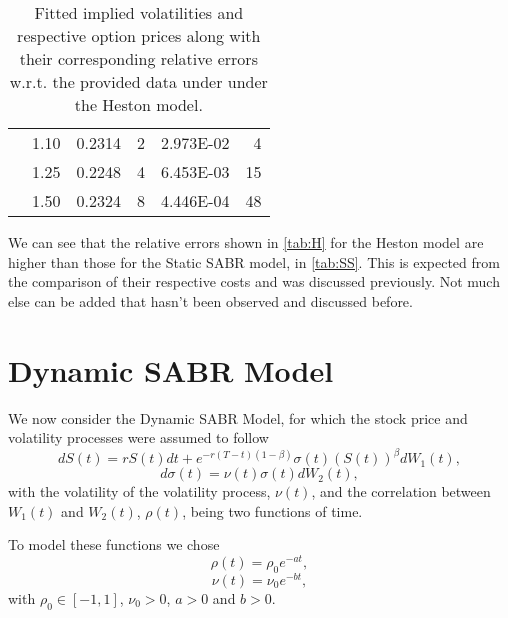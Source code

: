 \begin{table}[H]
\begin{tabular}{@{}cccrcr@{}}
 & 1.10 & 0.2314 & 2 & \num{2.973E-02} & 4 \\
 & 1.25 & 0.2248 & 4 & \num{6.453E-03} & 15 \\
 & 1.50 & 0.2324 & 8 & \num{4.446E-04} & 48 \\ \bottomrule
\end{tabular}
  \caption[Fitted implied volatilities and respective option prices along with their corresponding relative errors w.r.t. the provided data under under the Heston model.]{Fitted implied volatilities and respective option prices along with their corresponding relative errors w.r.t. the provided data under under the Heston model.}
  \label{tab:H}
\end{table}

We can see that the relative errors shown in \autoref{tab:H} for the Heston model are higher than those for the Static SABR model, in \autoref{tab:SS}. This is expected from the comparison of their respective costs and was discussed previously.
Not much else can be added that hasn't been observed and discussed before.









\newpage

\section{Dynamic SABR Model}

We now consider the Dynamic SABR Model, for which the stock price and volatility processes were assumed to follow
\begin{equation}
dS(t)=rS(t)dt+e^{-r(T-t)(1-\beta)}\sigma(t) (S(t))^\beta dW_1(t),
\end{equation}
\begin{equation}
d\sigma(t)=\nu(t)\sigma(t) dW_2(t),
\end{equation}
\noindent with the volatility of the volatility process, $\nu(t)$, and the correlation between $W_1(t)$ and $W_2(t)$, $\rho(t)$, being two functions of time.

To model these functions we chose
\begin{equation}
\rho(t)=\rho_0e^{-at},
\end{equation}
\begin{equation}
\nu(t)=\nu_0e^{-bt},
\end{equation}
\noindent with $\rho_0\in[-1,1]$, $\nu_0>0$, $a>0$ and $b>0$.


